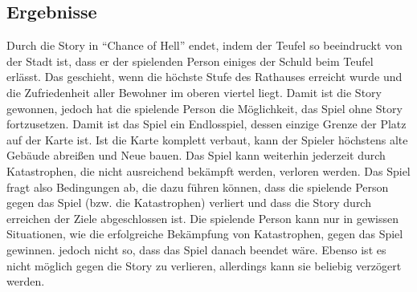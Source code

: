 \documentclass[paper=A4,pagesize=auto,12pt,headinclude=true,footinclude=true,BCOR=0mm,DIV=calc]{scrartcl}
\newcommand{\sectionspace}{
	\vspace{0.5cm}
}
\newcommand{\gametitle}{Chance of Hell}
\begin{document}
\subsection{Ergebnisse}\label{sec:Ergebnisse}
Durch die Story in ``\gametitle'' endet, indem der Teufel so beeindruckt von der Stadt ist, dass er der spielenden Person einiges der Schuld beim Teufel erlässt. Das geschieht, wenn die höchste Stufe des Rathauses erreicht wurde und die Zufriedenheit aller Bewohner im oberen viertel liegt. Damit ist die Story gewonnen, jedoch hat die spielende Person die Möglichkeit, das Spiel ohne Story fortzusetzen. Damit ist das Spiel ein Endlosspiel, dessen einzige Grenze der Platz auf der Karte ist. Ist die Karte komplett verbaut, kann der Spieler höchstens alte Gebäude abreißen und Neue bauen. Das Spiel kann weiterhin jederzeit durch Katastrophen, die nicht ausreichend bekämpft werden, verloren werden.
Das Spiel fragt also Bedingungen ab, die dazu führen können, dass die spielende Person gegen das Spiel (bzw. die Katastrophen) verliert und dass die Story durch erreichen der Ziele abgeschlossen ist. Die spielende Person kann nur in gewissen Situationen, wie die erfolgreiche Bekämpfung von Katastrophen, gegen das Spiel gewinnen. jedoch nicht so, dass das Spiel danach beendet wäre. Ebenso ist es nicht möglich gegen die Story zu verlieren, allerdings kann sie beliebig verzögert werden.


\sectionspace
\printbibliography[heading=bibnumbered, title=Referenzen]\label{sec:Referenzen}
\end{document}
